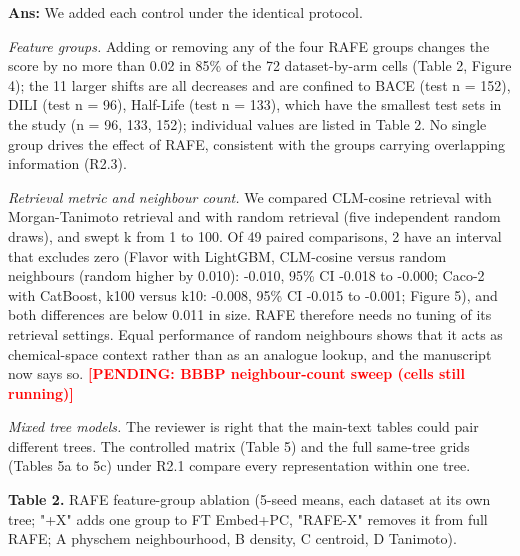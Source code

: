 \documentclass[
  10pt,
]{article}
\newcommand{\placeholder}[1]{\textcolor{red}{\textbf{[PENDING#1]}}}
\begin{document}
\textbf{Ans:} We added each control under the identical protocol.

\emph{Feature groups.} Adding or removing any of the four RAFE groups
changes the score by no more than 0.02 in 85\% of the 72 dataset-by-arm
cells (Table 2, Figure 4); the 11 larger shifts are all decreases and
are confined to BACE (test n = 152), DILI (test n = 96), Half-Life (test
n = 133), which have the smallest test sets in the study (n = 96, 133,
152); individual values are listed in Table 2. No single group drives
the effect of RAFE, consistent with the groups carrying overlapping
information (R2.3).

\emph{Retrieval metric and neighbour count.} We compared CLM-cosine
retrieval with Morgan-Tanimoto retrieval and with random retrieval (five
independent random draws), and swept k from 1 to 100. Of 49 paired
comparisons, 2 have an interval that excludes zero (Flavor with
LightGBM, CLM-cosine versus random neighbours (random higher by 0.010):
-0.010, 95\% CI -0.018 to -0.000; Caco-2 with CatBoost, k100 versus k10:
-0.008, 95\% CI -0.015 to -0.001; Figure 5), and both differences are
below 0.011 in size. RAFE therefore needs no tuning of its retrieval
settings. Equal performance of random neighbours shows that it acts as
chemical-space context rather than as an analogue lookup, and the
manuscript now says so. \placeholder{: BBBP neighbour-count sweep
(cells still running)}

\emph{Mixed tree models.} The reviewer is right that the main-text
tables could pair different trees. The controlled matrix (Table 5) and
the full same-tree grids (Tables 5a to 5c) under R2.1 compare every
representation within one tree.

\textbf{Table 2.} RAFE feature-group ablation (5-seed means, each
dataset at its own tree; "+X" adds one group to FT Embed+PC, "RAFE-X"
removes it from full RAFE; A physchem neighbourhood, B density, C
centroid, D Tanimoto).
\end{document}
